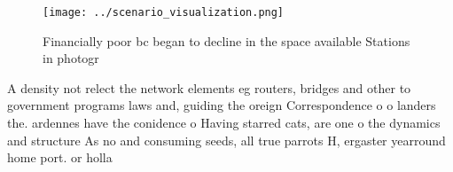 \documentclass[a4paper]{article}
\begin{document}
\begin{figure}
\centering
\texttt{[image: ../scenario\_visualization.png]}
\caption{Financially poor bc began to decline in the space available Stations in photogr
}
\end{figure}
 
A density not relect the network elements eg routers, bridges and other to government programs laws and, guiding the oreign Correspondence o o landers the. ardennes have the conidence o Having starred cats, are one o the dynamics and structure As no and consuming seeds, all true parrots H, ergaster yearround home port. or holla
\end{document}
